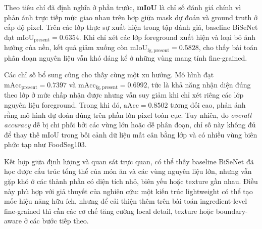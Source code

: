Theo tiêu chí đã định nghĩa ở phần trước, \textbf{mIoU} là chỉ số đánh giá chính vì phản ánh trực tiếp mức giao nhau trên hợp giữa mask dự đoán và ground truth ở cấp độ pixel. Trên các lớp thực sự xuất hiện trong tập đánh giá, baseline BiSeNet đạt $\mathrm{mIoU}_{\mathrm{present}} = 0.6354$. Khi chỉ xét các lớp foreground xuất hiện và loại bỏ ảnh hưởng của nền, kết quả giảm xuống còn $\mathrm{mIoU}_{\mathrm{fg,present}} = 0.5828$, cho thấy bài toán phân đoạn nguyên liệu vẫn khó đáng kể ở những vùng mang tính fine-grained.

Các chỉ số bổ sung cũng cho thấy cùng một xu hướng. Mô hình đạt $\mathrm{mAcc}_{\mathrm{present}} = 0.7397$ và $\mathrm{mAcc}_{\mathrm{fg,present}} = 0.6992$, tức là khả năng nhận diện đúng theo lớp ở mức chấp nhận được nhưng vẫn suy giảm khi chỉ xét riêng các lớp nguyên liệu foreground. Trong khi đó, $\mathrm{aAcc} = 0.8502$ tương đối cao, phản ánh rằng mô hình dự đoán đúng trên phần lớn pixel toàn cục. Tuy nhiên, do \textit{overall accuracy} dễ bị chi phối bởi các vùng lớn hoặc dễ phân đoạn, chỉ số này không đủ để thay thế mIoU trong bối cảnh dữ liệu mất cân bằng lớp và có nhiều vùng biên phức tạp như FoodSeg103.

Kết hợp giữa định lượng và quan sát trực quan, có thể thấy baseline BiSeNet đã học được cấu trúc tổng thể của món ăn và các vùng nguyên liệu lớn, nhưng vẫn gặp khó ở các thành phần có diện tích nhỏ, biên yếu hoặc texture gần nhau. Điều này phù hợp với giả thuyết của nghiên cứu: một kiến trúc lightweight có thể tạo mốc hiệu năng hữu ích, nhưng để cải thiện thêm trên bài toán ingredient-level fine-grained thì cần các cơ chế tăng cường local detail, texture hoặc boundary-aware ở các bước tiếp theo.


